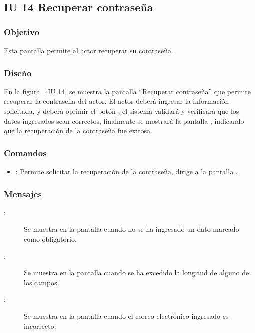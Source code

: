 \newpage 
\subsection{IU 14 Recuperar contraseña}

\subsubsection{Objetivo}
	
	Esta pantalla permite al actor recuperar su contraseña.

\subsubsection{Diseño}

    En la figura ~\ref{IU 14} se muestra la pantalla ``Recuperar contraseña'' que permite recuperar la contraseña del actor. El actor deberá ingresar la información solicitada, y deberá oprimir el botón , el sistema validará y verificará que los datos ingresados sean correctos, finalmente se mostrará la pantalla , indicando que la recuperación de la contraseña fue exitosa.


   

\subsubsection{Comandos}
\begin{itemize}
	\item {}: Permite solicitar la recuperación de la contraseña, dirige a la pantalla .
\end{itemize}

\subsubsection{Mensajes}

	
\begin{description}
	\item[:] Se muestra en la pantalla  cuando no se ha ingresado un dato marcado como obligatorio.
	\item[:] Se muestra en la pantalla  cuando se ha excedido la longitud de alguno de los campos.
	\item[:] Se muestra en la pantalla  cuando el correo electrónico ingresado es incorrecto.
\end{description}

